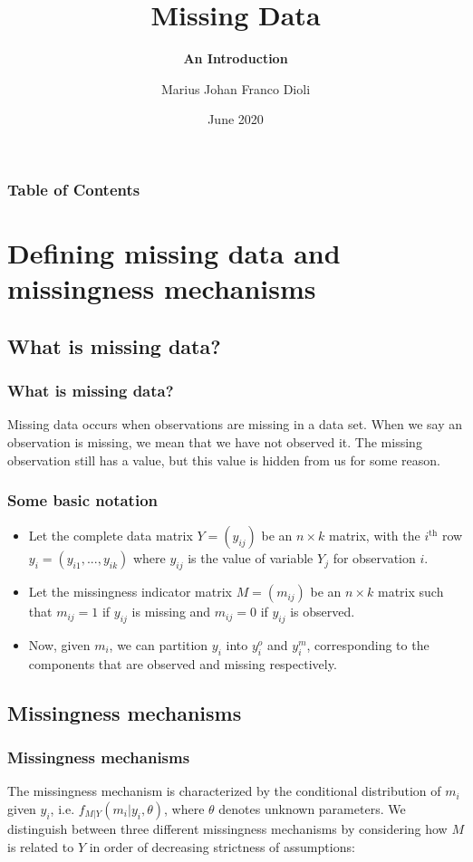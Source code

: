 \documentclass{beamer}
\title{\textbf{Missing Data}}
\subtitle{\textbf{An Introduction}}
\author{Marius Johan Franco Dioli}
\date{June 2020}
\begin{document}
	
	
	
	\frame{\titlepage}
	
	

\begin{frame}
\frametitle{Table of Contents}
\tableofcontents
\end{frame}


\section{Defining missing data and missingness mechanisms}
\subsection{What is missing data?}
\begin{frame}
\frametitle{What is missing data?}
Missing data occurs when observations are missing in a data set. When we say an observation is missing, we mean that we have not observed it. The missing observation still has a value, but this value is hidden from us for some reason.
\end{frame}


\begin{frame}
\frametitle{Some basic notation}
\begin{itemize}
	\item<1-> Let the complete data matrix $Y=(y_{ij})$ be an $n \times k$ matrix, with the $i^{\text{th}}$ row $y_{i}=(y_{i1}, ..., y_{ik})$ where $y_{ij}$ is the value of variable $Y_{j}$ for observation $i$.
	\item<2->Let the missingness indicator matrix $M = (m_{ij})$ be an $n \times k$ matrix such that $m_{ij} = 1$ if $y_{ij}$ is missing and $m_{ij} = 0$ if $y_{ij}$ is observed.
	\item<3->Now, given $m_{i}$, we can partition $y_{i}$ into $y^{o}_{i}$ and $y^{m}_{i}$, corresponding to the components that are observed and missing respectively. 
\end{itemize}
\end{frame}

\subsection{Missingness mechanisms}
\begin{frame}
\frametitle{Missingness mechanisms}
The missingness mechanism is characterized by the conditional distribution of $m_{i}$ given $y_{i}$, i.e. $f_{M|Y}(m_{i}|y_{i}, \theta)$, where $\theta$ denotes unknown parameters. We distinguish between three different missingness mechanisms by considering how $M$ is related to $Y$ in order of decreasing strictness of assumptions: 
\end{frame}
\end{document}
